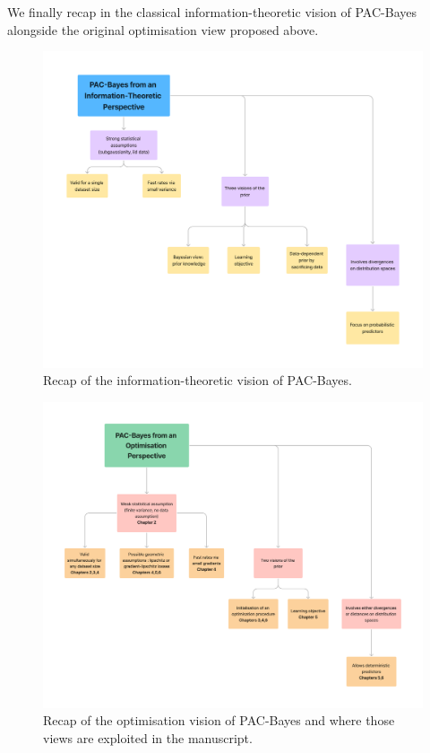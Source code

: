 We finally recap in  the classical information-theoretic vision of PAC-Bayes alongside the original optimisation view proposed above. 

\begin{figure}[ht]
  \centering
  \includegraphics[width=1.0\linewidth]{chapter_1/recap-info.pdf}
  \caption{Recap of the information-theoretic vision of PAC-Bayes.}
  \label{fig: recap-info}
\end{figure}
 
\begin{figure}[ht]
  \centering
  \includegraphics[width=1.0\linewidth]{chapter_1/recap-optim.pdf}
  \caption{Recap of the optimisation vision of PAC-Bayes and  where those views are exploited in the manuscript.}
  \label{fig: recap-optim}
\end{figure}


